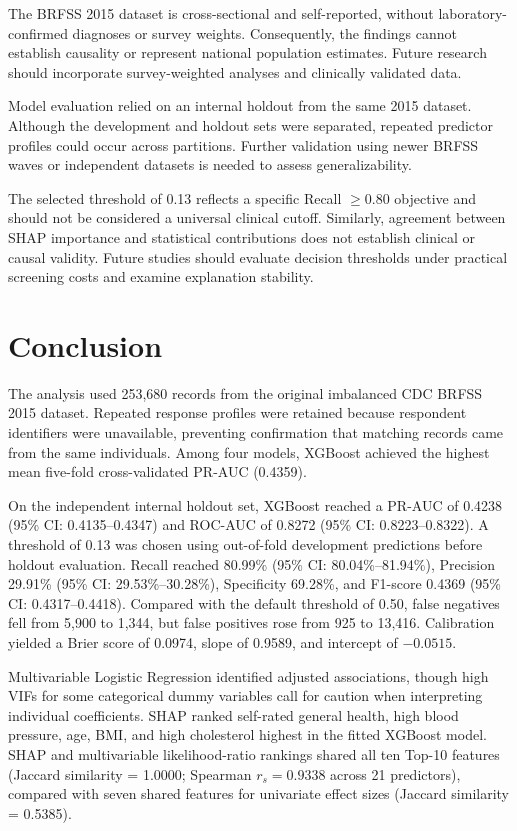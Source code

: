 \documentclass[pdflatex,sn-basic,Numbered]{sn-jnl}
\begin{document}
The BRFSS 2015 dataset is cross-sectional and self-reported, without laboratory-confirmed diagnoses or survey weights. Consequently, the findings cannot establish causality or represent national population estimates. Future research should incorporate survey-weighted analyses and clinically validated data.

Model evaluation relied on an internal holdout from the same 2015 dataset. Although the development and holdout sets were separated, repeated predictor profiles could occur across partitions. Further validation using newer BRFSS waves or independent datasets is needed to assess generalizability.

The selected threshold of 0.13 reflects a specific Recall $\geq 0.80$ objective and should not be considered a universal clinical cutoff. Similarly, agreement between SHAP importance and statistical contributions does not establish clinical or causal validity. Future studies should evaluate decision thresholds under practical screening costs and examine explanation stability.




\section{Conclusion}\label{sec:conclusion}

The analysis used 253,680 records from the original imbalanced CDC BRFSS 2015 dataset. Repeated response profiles were retained because respondent identifiers were unavailable, preventing confirmation that matching records came from the same individuals. Among four models, XGBoost achieved the highest mean five-fold cross-validated PR-AUC (0.4359).

On the independent internal holdout set, XGBoost reached a PR-AUC of 0.4238 (95\% CI: 0.4135--0.4347) and ROC-AUC of 0.8272 (95\% CI: 0.8223--0.8322). A threshold of 0.13 was chosen using out-of-fold development predictions before holdout evaluation. Recall reached 80.99\% (95\% CI: 80.04\%--81.94\%), Precision 29.91\% (95\% CI: 29.53\%--30.28\%), Specificity 69.28\%, and F1-score 0.4369 (95\% CI: 0.4317--0.4418). Compared with the default threshold of 0.50, false negatives fell from 5,900 to 1,344, but false positives rose from 925 to 13,416. Calibration yielded a Brier score of 0.0974, slope of 0.9589, and intercept of $-0.0515$.

Multivariable Logistic Regression identified adjusted associations, though high VIFs for some categorical dummy variables call for caution when interpreting individual coefficients. SHAP ranked self-rated general health, high blood pressure, age, BMI, and high cholesterol highest in the fitted XGBoost model. SHAP and multivariable likelihood-ratio rankings shared all ten Top-10 features (Jaccard similarity = 1.0000; Spearman $r_s=0.9338$ across 21 predictors), compared with seven shared features for univariate effect sizes (Jaccard similarity = 0.5385).
\end{document}
